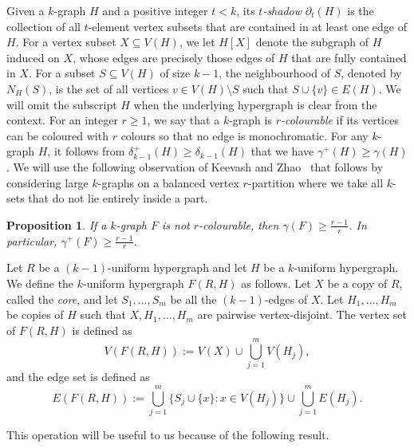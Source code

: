 \documentclass[11pt]{article}
\newtheorem{proposition}[theorem]{Proposition}
\begin{document}
Given a $k$-graph $H$ and a positive integer $t<k$, its \emph{$t$-shadow} $\partial_{t}(H)$ is the collection of all $t$-element vertex subsets that are contained in at least one edge of $H$.
For a vertex subset $X \subseteq V(H)$, we let $H[X]$ denote the subgraph of $H$ induced on $X$, whose edges are precisely those edges of $H$ that are fully contained in $X$.
For a subset $S \subseteq V(H)$ of size $k-1$, the neighbourhood of $S$, denoted by $N_{H}(S)$, is the set of all vertices $v \in V(H) \setminus S$ such that $S \cup \{v\} \in E(H)$.
We will omit the subscript $H$ when the underlying hypergraph is clear from the context.
For an integer $r \ge 1$, we say that a $k$-graph is \emph{$r$-colourable} if its vertices can be coloured with $r$ colours so that no edge is monochromatic.
For any $k$-graph $H$, it follows from $\delta^+_{k-1}(H) \ge \delta_{k-1}(H)$ that we have $\gamma^+(H)\ge \gamma(H)$.
We will use the following observation of Keevash and Zhao~\cite{KZ07} that follows by considering large $k$-graphs on a balanced vertex $r$-partition where we take all $k$-sets that do not lie entirely inside a part.

\begin{proposition}\label{ob:KZ}
If a $k$-graph $F$ is not $r$-colourable, then $\gamma(F)\ge \frac{r-1}{r}$. In particular, $\gamma^+(F)\ge \frac{r-1}{r}$.
\end{proposition}


Let $R$ be a $(k-1)$-uniform hypergraph and let $H$ be a $k$-uniform hypergraph. 
We define the $k$-uniform hypergraph $F(R,H)$ as follows. Let $X$ be a 
copy of $R$, called the \emph{core}, and let $S_1, \dots, S_m$ be all the $(k-1)$-edges of $X$. 
Let $H_1, \dots, H_m$ be copies of $H$ such that $X, H_1, \dots, H_m$ 
are pairwise vertex-disjoint. 
The vertex set of $F(R,H)$ is defined as
\[
V(F(R,H)) := V(X) \cup \bigcup_{j=1}^m V(H_j),
\]
and the edge set is defined as
\[
E(F(R,H)) := \bigcup_{j=1}^m \{S_j \cup \{x\} : x \in V(H_j)\} \cup \bigcup_{j=1}^m E(H_j).
\]

This operation will be useful to us because of the following result.
\end{document}

